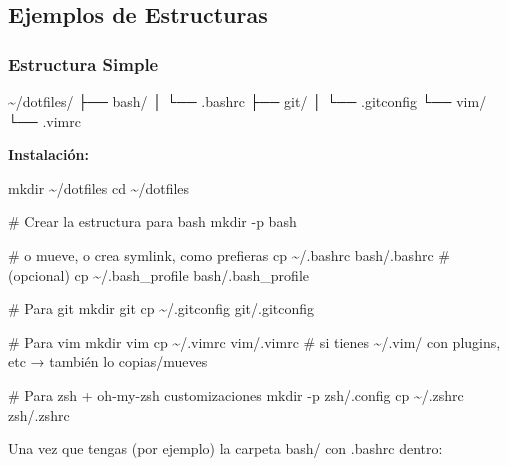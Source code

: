 \documentclass[
  doc,
  floatsintext,
  longtable,
  a4paper,
  nolmodern,
  notxfonts,
  notimes,
  12pt,
  colorlinks=true,linkcolor=blue,citecolor=blue,urlcolor=blue]{apa7}
\newenvironment{Shaded}{\begin{snugshade}}{\end{snugshade}}
\newcommand{\AttributeTok}[1]{\textcolor[rgb]{0.40,0.45,0.13}{#1}}
\newcommand{\BuiltInTok}[1]{\textcolor[rgb]{0.00,0.23,0.31}{#1}}
\newcommand{\CommentTok}[1]{\textcolor[rgb]{0.37,0.37,0.37}{#1}}
\newcommand{\ExtensionTok}[1]{\textcolor[rgb]{0.00,0.23,0.31}{#1}}
\newcommand{\FunctionTok}[1]{\textcolor[rgb]{0.28,0.35,0.67}{#1}}
\newcommand{\NormalTok}[1]{\textcolor[rgb]{0.00,0.23,0.31}{#1}}
\begin{document}
\subsection{Ejemplos de Estructuras}\label{ejemplos-de-estructuras}

\subsubsection{Estructura Simple}\label{estructura-simple}

\begin{Shaded}
\begin{Highlighting}[]
\ExtensionTok{\textasciitilde{}/dotfiles/}
\ExtensionTok{├──}\NormalTok{ bash/}
\ExtensionTok{│}\NormalTok{   └── .bashrc}
\ExtensionTok{├──}\NormalTok{ git/}
\ExtensionTok{│}\NormalTok{   └── .gitconfig}
\ExtensionTok{└──}\NormalTok{ vim/}
    \ExtensionTok{└──}\NormalTok{ .vimrc}
\end{Highlighting}
\end{Shaded}

\textbf{Instalación:}

\begin{Shaded}
\begin{Highlighting}[]
\FunctionTok{mkdir}\NormalTok{ \textasciitilde{}/dotfiles}
\BuiltInTok{cd}\NormalTok{ \textasciitilde{}/dotfiles}

\CommentTok{\# Crear la estructura para bash}
\FunctionTok{mkdir} \AttributeTok{{-}p}\NormalTok{ bash}

\CommentTok{\# o mueve, o crea symlink, como prefieras}
\FunctionTok{cp}\NormalTok{ \textasciitilde{}/.bashrc bash/.bashrc           }
\CommentTok{\# (opcional) cp \textasciitilde{}/.bash\_profile bash/.bash\_profile}

\CommentTok{\# Para git}
\FunctionTok{mkdir}\NormalTok{ git}
\FunctionTok{cp}\NormalTok{ \textasciitilde{}/.gitconfig git/.gitconfig}

\CommentTok{\# Para vim}
\FunctionTok{mkdir}\NormalTok{ vim}
\FunctionTok{cp}\NormalTok{ \textasciitilde{}/.vimrc vim/.vimrc}
\CommentTok{\# si tienes \textasciitilde{}/.vim/ con plugins, etc → también lo copias/mueves}

\CommentTok{\# Para zsh + oh{-}my{-}zsh customizaciones}
\FunctionTok{mkdir} \AttributeTok{{-}p}\NormalTok{ zsh/.config}
\FunctionTok{cp}\NormalTok{ \textasciitilde{}/.zshrc zsh/.zshrc}
\end{Highlighting}
\end{Shaded}

Una vez que tengas (por ejemplo) la carpeta bash/ con .bashrc dentro:
\end{document}
